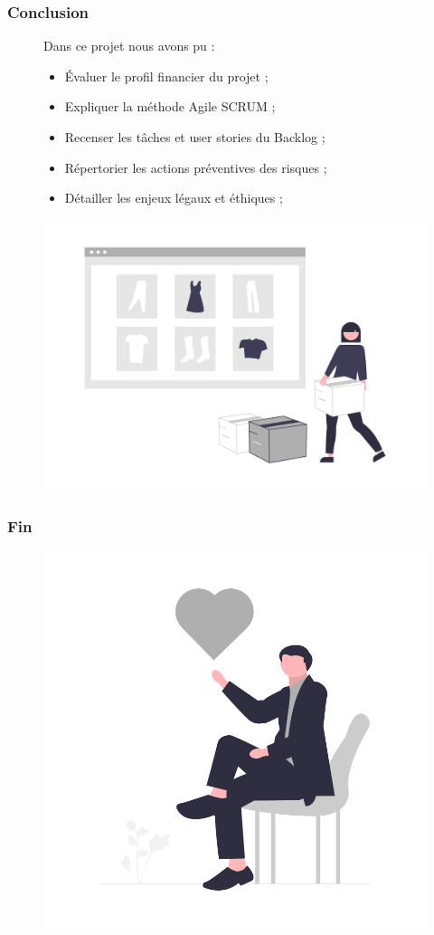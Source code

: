 \documentclass[9pt]{beamer}
\begin{document}
\begin{frame}
	\frametitle{Conclusion}
\begin{figure}[!htb]
   \begin{minipage}{0.6\textwidth}
Dans ce projet nous avons pu :
\begin{itemize}
\item Évaluer le profil financier du projet ;
\item Expliquer la méthode Agile SCRUM ;
\item Recenser les tâches et user stories du Backlog ;
\item Répertorier les actions préventives des risques ;
\item Détailler les enjeux légaux et éthiques ;

\end{itemize}
 \end{minipage}\hfill
   \begin{minipage}{0.4\textwidth}
     \centering
     \includegraphics[width=1\linewidth]{../media/web_shopping}
     \label{Fig:web_shopping}
   \end{minipage}
\end{figure}
\end{frame}
\begin{frame}
	\frametitle{Fin}
	\begin{figure}[!htb]
     \centering
     \includegraphics[width=.7\textwidth]{../media/appreciated}
   \label{Fig:appreciated}
\end{figure}
\end{frame}
\end{document}
